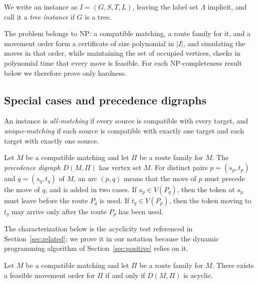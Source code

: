 \documentclass[a4paper,USenglish,thm-restate]{lipics-v2021}
\theoremstyle{problemstyle}
\begin{document}
We write an instance as $I=(G,S,T,L)$, leaving the label set $\Lambda$
implicit, and call it a \emph{tree instance} if $G$ is a tree.

The problem belongs to \textsf{NP}: a compatible matching, a route family for
it, and a movement order form a certificate of size polynomial in $|I|$, and
simulating the moves in that order, while maintaining the set of occupied
vertices, checks in polynomial time that every move is feasible. For each
\textsf{NP}-completeness result below we therefore prove only hardness.

\subsection{Special cases and precedence digraphs}
An instance is \emph{all-matching} if every source is compatible with every
target, and \emph{unique-matching} if each source is compatible with exactly
one target and each target with exactly one source.

Let $M$ be a compatible matching and let $\Pi$ be a route family for $M$.
The \emph{precedence digraph} $D(M,\Pi)$ has vertex set $M$. For
distinct pairs $p=(s_p,t_p)$ and $q=(s_q,t_q)$ of $M$, an arc $(p,q)$
means that the move of $p$ must precede the move of $q$, and is added
in two cases. If $s_p\in V(P_q)$, then the token at $s_p$ must leave
before the route $P_q$ is used. If $t_q\in V(P_p)$, then the token
moving to $t_q$ may arrive only after the route $P_p$ has been used.

The characterization below is the acyclicity test referenced in
Section~\ref{sec:related}; we prove it in our notation because the dynamic
programming algorithm of Section~\ref{sec:positive} relies on it.

\begin{observation}\label{obs:precedence-acyclicity}
Let $M$ be a compatible matching and let $\Pi$ be a route family for $M$. There
exists a feasible movement order for $\Pi$ if and only if $D(M,\Pi)$ is acyclic.
\end{observation}
\end{document}
